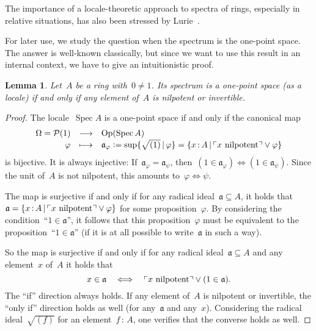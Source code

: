 \documentclass[10pt]{amsart}
\theoremstyle{definition}
\theoremstyle{plain}
\newtheorem{lemma}[defn]{Lemma}
\theoremstyle{remark}
\renewcommand{\P}{\mathcal{P}}
\newcommand{\aaa}{\mathfrak{a}}
\DeclareMathOperator{\Spec}{Spec}
\newcommand{\Open}{\mathrm{Op}}
\newcommand{\?}{\,{:}\,}
\renewcommand{\_}{\mathpunct{.}\,}
\newcommand{\speak}[1]{\ulcorner\text{\textnormal{#1}}\urcorner}
\newcommand{\defeq}{\vcentcolon=}
\begin{document}
The importance of a locale-theoretic approach to spectra of rings, especially in
relative situations, has also been stressed by Lurie~\cite[page~37]{lurie:dag5}.

For later use, we study the question when the spectrum is the one-point space.
The answer is well-known classically, but since we want to use this result in
an internal context, we have to give an intuitionistic proof.
\begin{lemma}\label{lemma:spectrum-one-point}
Let~$A$ be a ring with~$0 \neq 1$. Its spectrum is a one-point
space (as a locale) if and only if any element of~$A$ is nilpotent or
invertible.\end{lemma}
\begin{proof}The locale~$\Spec A$ is a one-point space if and only if the
canonical map
\[ \begin{array}{@{}rcl@{}}
  \Omega = \P(1) &\longrightarrow& \Open(\Spec A) \\[0.1em]
  \varphi &\longmapsto& \aaa_\varphi \defeq \sup\{\sqrt{(1)} \,|\, \varphi \} =
  \{ x \? A \,|\, \speak{$x$ nilpotent} \vee \varphi \}
\end{array} \]
is bijective. It is always injective: If~$\aaa_\varphi = \aaa_\psi$,
then~$(1 \in \aaa_\varphi) \Leftrightarrow (1 \in \aaa_\psi)$. Since the unit
of~$A$ is not nilpotent, this amounts to~$\varphi \Leftrightarrow \psi$.

The map is surjective if and only if for any radical ideal~$\aaa \subseteq A$,
it holds that~$\aaa = \{ x \? A \,|\, \speak{$x$ nilpotent} \vee \varphi \}$
for some proposition~$\varphi$. By considering the condition~``$1 \in \aaa$'',
it follows that this proposition~$\varphi$ must be equivalent to the
proposition~``$1 \in \aaa$'' (if it is at all possible to write~$\aaa$ in such
a way).

So the map is surjective if and only if for any radical ideal~$\aaa \subseteq
A$ and any element~$x$ of~$A$ it holds that
\[ x \in \aaa \quad\Longleftrightarrow\quad
  \speak{$x$ nilpotent} \vee (1 \in \aaa). \]
The ``if'' direction always holds. If any element of~$A$ is nilpotent or
invertible, the ``only if'' direction holds as well (for any~$\aaa$ and any~$x$).
Considering the radical ideal~$\sqrt{(f)}$ for an element~$f \? A$, one
verifies that the converse holds as well.
\end{proof}
\end{document}
